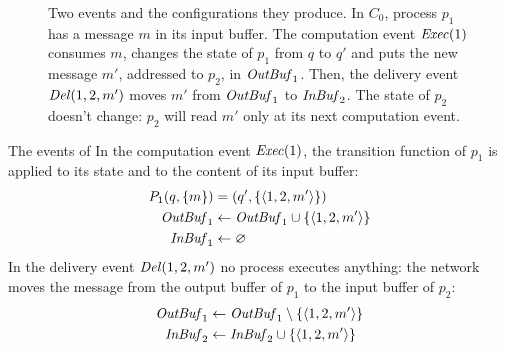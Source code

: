 \begin{figure}[H]
  \centering
  \caption{Two events and the configurations they produce. In $C_0$, process $p_1$ has a message $m$ in its input buffer. The computation event $\mathit{Exec}(1)$ consumes $m$, changes the state of $p_1$ from $q$ to $q'$ and puts the new message $m'$, addressed to $p_2$, in $\mathit{OutBuf}_1$. Then, the delivery event $\mathit{Del}(1,2,m')$ moves $m'$ from $\mathit{OutBuf}_1$ to $\mathit{InBuf}_2$. The state of $p_2$ doesn't change: $p_2$ will read $m'$ only at its next computation event.}
  \label{fig:execution-steps}
\end{figure}

\begin{framedex}{The events of }
  In the computation event $\mathit{Exec}(1)$, the transition function of $p_1$ is applied to its state and to the content of its input buffer:
  \begin{align*}
    P_1(q, \{m\}) &= (q', \{\left\langle 1,2,m' \right\rangle\}) \\
    \mathit{OutBuf}_1 &\leftarrow \mathit{OutBuf}_1 \cup \{\left\langle 1,2,m' \right\rangle\} \\
    \mathit{InBuf}_1 &\leftarrow \varnothing
  \end{align*}
  In the delivery event $\mathit{Del}(1,2,m')$ no process executes anything: the network moves the message from the output buffer of $p_1$ to the input buffer of $p_2$:
  \begin{align*}
    \mathit{OutBuf}_1 &\leftarrow \mathit{OutBuf}_1 \setminus \{\left\langle 1,2,m' \right\rangle\} \\
    \mathit{InBuf}_2 &\leftarrow \mathit{InBuf}_2 \cup \{\left\langle 1,2,m' \right\rangle\}
  \end{align*}
\end{framedex}

